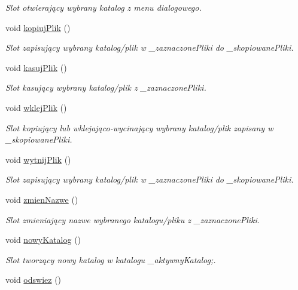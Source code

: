 \begin{DoxyCompactItemize}
\begin{DoxyCompactList}\small\item\em Slot otwierający wybrany katalog z menu dialogowego. \item\end{DoxyCompactList}\item 
void \hyperlink{class_file_system_controller_af8b9a716f658d2da91e081e29ea532d8}{kopiujPlik} ()
\begin{DoxyCompactList}\small\item\em Slot zapisujący wybrany katalog/plik w \_\-zaznaczonePliki do \_\-skopiowanePliki. \item\end{DoxyCompactList}\item 
void \hyperlink{class_file_system_controller_a471c54e4469a31ef5d9064c0684d2310}{kasujPlik} ()
\begin{DoxyCompactList}\small\item\em Slot kasujący wybrany katalog/plik z \_\-zaznaczonePliki. \item\end{DoxyCompactList}\item 
void \hyperlink{class_file_system_controller_ac3814a6756b452c4ae988c29ebb73399}{wklejPlik} ()
\begin{DoxyCompactList}\small\item\em Slot kopiujący lub wklejająco-\/wycinający wybrany katalog/plik zapisany w \_\-skopiowanePliki. \item\end{DoxyCompactList}\item 
void \hyperlink{class_file_system_controller_a96da90d7d562034c694b7b82bb7c6509}{wytnijPlik} ()
\begin{DoxyCompactList}\small\item\em Slot zapisujący wybrany katalog/plik w \_\-zaznaczonePliki do \_\-skopiowanePliki. \item\end{DoxyCompactList}\item 
void \hyperlink{class_file_system_controller_a3cbbd462b402b91ec9129f39c136ee04}{zmienNazwe} ()
\begin{DoxyCompactList}\small\item\em Slot zmieniający nazwe wybranego katalogu/pliku z \_\-zaznaczonePliki. \item\end{DoxyCompactList}\item 
void \hyperlink{class_file_system_controller_aacb05c35c56cd6a8928b2831d7740b6d}{nowyKatalog} ()
\begin{DoxyCompactList}\small\item\em Slot tworzący nowy katalog w katalogu \_\-aktywnyKatalog;. \item\end{DoxyCompactList}\item 
\hypertarget{class_file_system_controller_a1ab998ea943306b57d6f1f32bfbeed2c}{
void \hyperlink{class_file_system_controller_a1ab998ea943306b57d6f1f32bfbeed2c}{odswiez} ()}
\label{class_file_system_controller_a1ab998ea943306b57d6f1f32bfbeed2c}


\end{DoxyCompactItemize}

